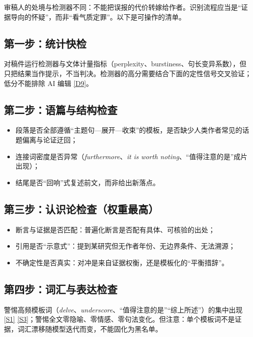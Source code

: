 \documentclass[10pt,a4paper]{ctexart}
\begin{document}
\begin{justifying}
审稿人的处境与检测器不同：不能把误报的代价转嫁给作者。识别流程应当是“证据导向的怀疑”，而非“看气质定罪”。以下是可操作的清单。

\subsection{第一步：统计快检}

对稿件运行检测器与文体计量指标（perplexity、burstiness、句长变异系数），但只把结果当作提示，不当判决。检测器的高分需要结合下面的定性信号交叉验证；低分不能排除 AI 编辑 \href{https://arxiv.org/abs/2608.27855}{[D9]}。

\subsection{第二步：语篇与结构检查}

\begin{itemize}[leftmargin=2em,itemsep=1pt]
\item 段落是否全部遵循“主题句—展开—收束”的模板，是否缺少人类作者常见的话题偏离与论证迂回；
\item 连接词密度是否异常（\textit{furthermore}、\textit{it is worth noting}、“值得注意的是”成片出现）；
\item 结尾是否“回响”式复述前文，而非给出新落点。
\end{itemize}

\subsection{第三步：认识论检查（权重最高）}

\begin{itemize}[leftmargin=2em,itemsep=1pt]
\item 断言与证据是否匹配：普遍化断言是否配有具体、可核验的出处；
\item 引用是否“示意式”：提到某研究但无作者年份、无边界条件、无法溯源；
\item 不确定性是否真实：对冲是来自证据权衡，还是模板化的“平衡措辞”。
\end{itemize}

\subsection{第四步：词汇与表达检查}

警惕高频模板词（\textit{delve}、\textit{underscore}、“值得注意的是”“综上所述”）的集中出现 \href{https://arxiv.org/abs/2404.01268}{[S1]} \href{https://www.medrxiv.org/content/10.1101/2024.05.14.24307373v1}{[S3]}；警惕全文零隐喻、零情感、零句法变化。但注意：单个模板词不是证据，词汇漂移随模型迭代而变，不能固化为黑名单。


\end{justifying}
\end{document}
